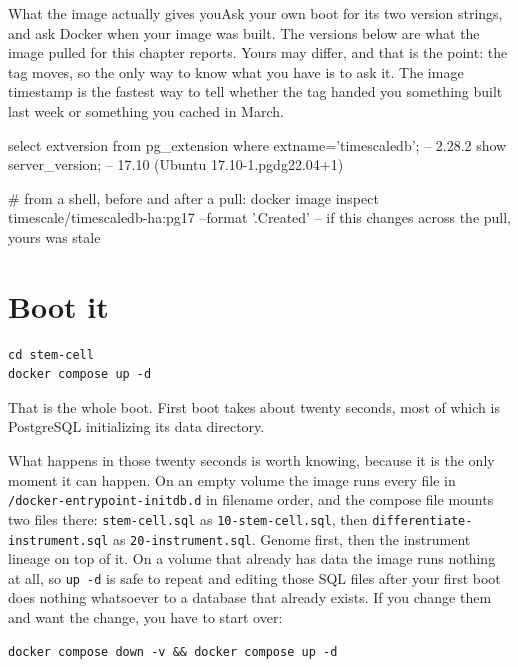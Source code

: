 \begin{Correspondence}{What the image actually gives you}{Ask your own boot for its two version strings, and ask Docker when your image was built.}
The versions below are what the image pulled for this chapter reports. Yours may differ, and that is the point: the tag moves, so the only way to know what you have is to ask it. The image timestamp is the fastest way to tell whether the tag handed you something built last week or something you cached in March.
\begin{Check}
select extversion from pg_extension where extname='timescaledb';
                                            -- 2.28.2
show server_version;                        -- 17.10 (Ubuntu 17.10-1.pgdg22.04+1)

# from a shell, before and after a pull:
docker image inspect timescale/timescaledb-ha:pg17 --format '{{.Created}}'
                                            -- if this changes across the pull, yours was stale
\end{Check}
\end{Correspondence}

\section{Boot it}

\begin{verbatim}
cd stem-cell
docker compose up -d
\end{verbatim}

That is the whole boot. First boot takes about twenty seconds, most of which is PostgreSQL initializing its data directory.

What happens in those twenty seconds is worth knowing, because it is the only moment it can happen. On an empty volume the image runs every file in \verb|/docker-entrypoint-initdb.d| in filename order, and the compose file mounts two files there: \verb|stem-cell.sql| as \verb|10-stem-cell.sql|, then \verb|differentiate-instrument.sql| as \verb|20-instrument.sql|. Genome first, then the instrument lineage on top of it. On a volume that already has data the image runs nothing at all, so \verb|up -d| is safe to repeat and editing those SQL files after your first boot does nothing whatsoever to a database that already exists. If you change them and want the change, you have to start over:

\begin{verbatim}
docker compose down -v && docker compose up -d
\end{verbatim}

